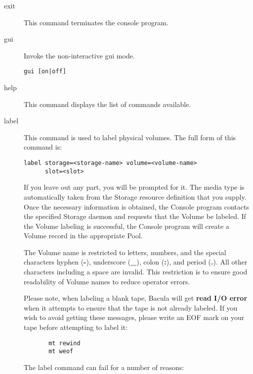 \begin{description}
\item [exit]
   This command terminates the console program.

\item [gui]
   Invoke the non-interactive gui mode.
\begin{verbatim}
gui [on|off]
\end{verbatim}

\item [help]
   This command displays the list of commands available.

\item [label]
   This command is used to label physical volumes.  The full form of this command
   is:

\begin{verbatim}
label storage=<storage-name> volume=<volume-name>
      slot=<slot>
\end{verbatim}

   If you leave out any part, you will be prompted for it.  The media type
   is automatically taken from the Storage resource definition that you
   supply.  Once the necessary information is obtained, the Console program
   contacts the specified Storage daemon and requests that the Volume be
   labeled.  If the Volume labeling is successful, the Console program will
   create a Volume record in the appropriate Pool.

   The Volume name is restricted to letters, numbers, and the special
   characters hyphen ({\bf -}), underscore ({\bf \_}), colon ({\bf :}), and
   period ({\bf .}).  All other characters including a space are invalid.
   This restriction is to ensure good readability of Volume names to reduce
   operator errors.

   Please note, when labeling a blank tape, Bacula will get {\bf read I/O
   error} when it attempts to ensure that the tape is not already labeled.  If
   you wish to avoid getting these messages, please write an EOF mark on
   your tape before attempting to label it:

\footnotesize
\begin{verbatim}
       mt rewind
       mt weof

\end{verbatim}
\normalsize

The label command can fail for a number of reasons:


\end{description}
